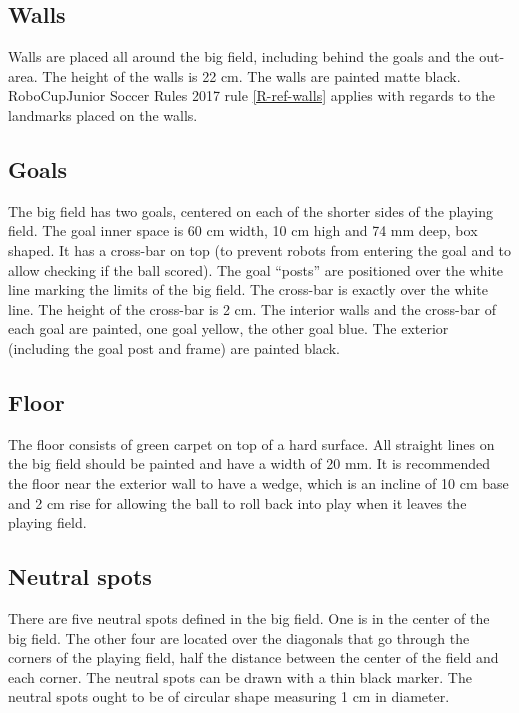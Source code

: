 \documentclass{article}
\begin{document}
\subsection{ Walls \label{ref-031}}


Walls are placed all around the big field, including behind the goals and the
out-area. The height of the walls is 22 cm. The walls are painted matte black.
RoboCupJunior Soccer Rules 2017 rule \ref{R-ref-walls} applies with regards to
the landmarks placed on the walls.

\subsection{ Goals \label{ref-032}}


The big field has two goals, centered on each of the shorter sides of the
playing field. The goal inner space is 60 cm width, 10 cm high and 74 mm deep,
box shaped. It has a cross-bar on top (to prevent robots from entering the goal
and to allow checking if the ball scored). The goal ``posts'' are positioned
over the white line marking the limits of the big field. The cross-bar is
exactly over the white line. The height of the cross-bar is 2 cm. The interior
walls and the cross-bar of each goal are painted, one goal yellow, the other
goal blue. The exterior (including the goal post and frame) are painted black.

\subsection{ Floor \label{ref-033}}

The floor consists of green carpet on top of a hard surface.
 All straight lines on the big field should be painted
and have a width of 20 mm. It is recommended the floor near the exterior wall
to have a wedge, which is an incline of 10 cm base and 2 cm rise for allowing
the ball to roll back into play when it leaves the playing field.

\subsection{ Neutral spots \label{ref-034}}

There are five neutral spots defined in the big field. One is in the center of
the big field. The other four are located over the diagonals that go through
the corners of the playing field, half the distance between the center of the
field and each corner. The neutral spots can be drawn with a thin black marker.
The neutral spots ought to be of circular shape measuring 1 cm in diameter.
\end{document}

